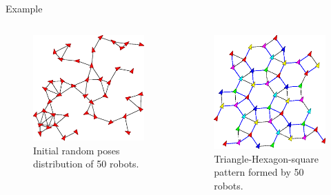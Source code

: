 \begin{frame}{Example}
  \begin{columns}
    \begin{column}{.45\textwidth}
        \begin{figure}
          \includegraphics[width=0.8\linewidth]{figs/initial50}
          \caption{Initial random poses distribution of 50 robots.}
        \end{figure}
    \end{column}
    \begin{column}{.45\textwidth}
        \begin{figure}
          \includegraphics[width=0.8\linewidth]{figs/final50}
          \caption{Triangle-Hexagon-square pattern formed by 50 robots.}
        \end{figure}
    \end{column}
  \end{columns}
\end{frame}

